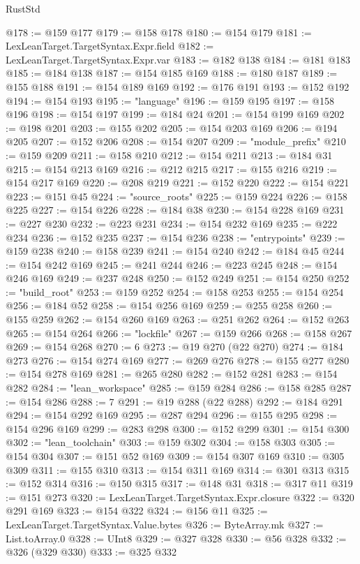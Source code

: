 \begin{lexlean}{RustStd}
\begin{coremodule}
@178 := @159 @177
@179 := @158 @178
@180 := @154 @179
@181 := LexLeanTarget.TargetSyntax.Expr.field
@182 := LexLeanTarget.TargetSyntax.Expr.var
@183 := @182 @138
@184 := @181 @183
@185 := @184 @138
@187 := @154 @185 @169
@188 := @180 @187
@189 := @155 @188
@191 := @154 @189 @169
@192 := @176 @191
@193 := @152 @192
@194 := @154 @193
@195 := "language"
@196 := @159 @195
@197 := @158 @196
@198 := @154 @197
@199 := @184 @24
@201 := @154 @199 @169
@202 := @198 @201
@203 := @155 @202
@205 := @154 @203 @169
@206 := @194 @205
@207 := @152 @206
@208 := @154 @207
@209 := "module_prefix"
@210 := @159 @209
@211 := @158 @210
@212 := @154 @211
@213 := @184 @31
@215 := @154 @213 @169
@216 := @212 @215
@217 := @155 @216
@219 := @154 @217 @169
@220 := @208 @219
@221 := @152 @220
@222 := @154 @221
@223 := @151 @45
@224 := "source_roots"
@225 := @159 @224
@226 := @158 @225
@227 := @154 @226
@228 := @184 @38
@230 := @154 @228 @169
@231 := @227 @230
@232 := @223 @231
@234 := @154 @232 @169
@235 := @222 @234
@236 := @152 @235
@237 := @154 @236
@238 := "entrypoints"
@239 := @159 @238
@240 := @158 @239
@241 := @154 @240
@242 := @184 @45
@244 := @154 @242 @169
@245 := @241 @244
@246 := @223 @245
@248 := @154 @246 @169
@249 := @237 @248
@250 := @152 @249
@251 := @154 @250
@252 := "build_root"
@253 := @159 @252
@254 := @158 @253
@255 := @154 @254
@256 := @184 @52
@258 := @154 @256 @169
@259 := @255 @258
@260 := @155 @259
@262 := @154 @260 @169
@263 := @251 @262
@264 := @152 @263
@265 := @154 @264
@266 := "lockfile"
@267 := @159 @266
@268 := @158 @267
@269 := @154 @268
@270 := 6
@273 := @19 @270 (@22 @270)
@274 := @184 @273
@276 := @154 @274 @169
@277 := @269 @276
@278 := @155 @277
@280 := @154 @278 @169
@281 := @265 @280
@282 := @152 @281
@283 := @154 @282
@284 := "lean_workspace"
@285 := @159 @284
@286 := @158 @285
@287 := @154 @286
@288 := 7
@291 := @19 @288 (@22 @288)
@292 := @184 @291
@294 := @154 @292 @169
@295 := @287 @294
@296 := @155 @295
@298 := @154 @296 @169
@299 := @283 @298
@300 := @152 @299
@301 := @154 @300
@302 := "lean_toolchain"
@303 := @159 @302
@304 := @158 @303
@305 := @154 @304
@307 := @151 @52 @169
@309 := @154 @307 @169
@310 := @305 @309
@311 := @155 @310
@313 := @154 @311 @169
@314 := @301 @313
@315 := @152 @314
@316 := @150 @315
@317 := @148 @31
@318 := @317 @11
@319 := @151 @273
@320 := LexLeanTarget.TargetSyntax.Expr.closure
@322 := @320 @291 @169
@323 := @154 @322
@324 := @156 @11
@325 := LexLeanTarget.TargetSyntax.Value.bytes
@326 := ByteArray.mk
@327 := List.toArray.{0}
@328 := UInt8
@329 := @327 @328
@330 := @56 @328
@332 := @326 (@329 @330)
@333 := @325 @332

\end{coremodule}
\end{lexlean}
